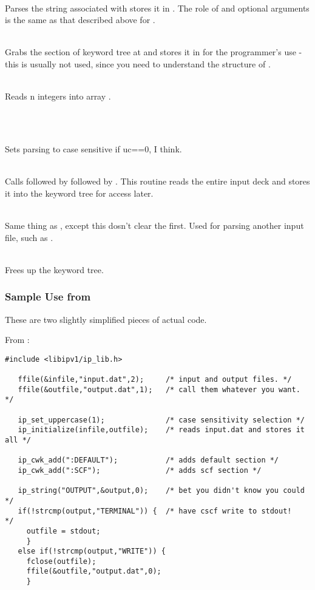 \\
Parses the string associated with  stores it in .
The role of  and optional arguments is the same as that
described above for .

 \\
Grabs the section of keyword tree at  and stores it in 
for the programmer's use - this is usually not used, since you need to 
understand the structure of .

 \\
Reads n integers into array .

\begin{center}  \\ \end{center}

 \\
Sets parsing to case sensitive if uc==0, I think.

 \\
Calls  followed by  followed by 
.  This routine reads the entire input deck
and stores it into the keyword tree for access later.

 \\
Same thing as , except this dosn't clear the 
 first.  Used for parsing another input file, such 
as .

 \\
Frees up the keyword tree.

\subsubsection{Sample Use from \PSIcscf}
These are two slightly simplified pieces of actual code.

From :
\begin{verbatim}
#include <libipv1/ip_lib.h>

   ffile(&infile,"input.dat",2);     /* input and output files. */
   ffile(&outfile,"output.dat",1);   /* call them whatever you want. */

   ip_set_uppercase(1);              /* case sensitivity selection */
   ip_initialize(infile,outfile);    /* reads input.dat and stores it all */

   ip_cwk_add(":DEFAULT");           /* adds default section */
   ip_cwk_add(":SCF");               /* adds scf section */

   ip_string("OUTPUT",&output,0);    /* bet you didn't know you could */
   if(!strcmp(output,"TERMINAL")) {  /* have cscf write to stdout!    */
     outfile = stdout;
     }
   else if(!strcmp(output,"WRITE")) {
     fclose(outfile);
     ffile(&outfile,"output.dat",0);
     }
\end{verbatim}

